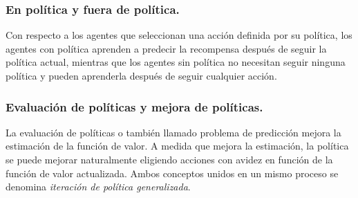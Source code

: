\documentclass{svproc}
\begin{document}
\subsubsection{En política y fuera de política.}\label{ss:onpolicyoffpolicy}
Con respecto a los agentes que seleccionan una acción definida por su política, los agentes con política aprenden a predecir la recompensa después de seguir la política actual, mientras que los agentes sin política no necesitan seguir ninguna política y pueden aprenderla después de seguir cualquier acción.

\subsubsection{Evaluación de políticas y mejora de políticas.}\label{ss:policyimprov}
La evaluación de políticas o también llamado problema de predicción \cite{sutton2018reinforcement} mejora la estimación de la función de valor. A medida que mejora la estimación, la política se puede mejorar naturalmente eligiendo acciones con avidez en función de la función de valor actualizada. Ambos conceptos unidos en un mismo proceso se denomina \emph{iteración de política generalizada}.


\end{document}
